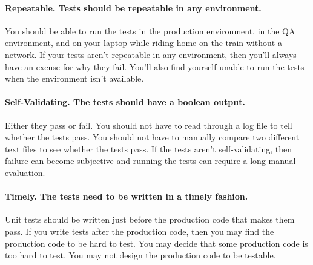 \paragraph{Repeatable. Tests should be repeatable in any environment.}
You should be able to run the tests in the production environment, in the QA environment, and on your laptop while riding home on the train without a network. 
If your tests aren’t repeatable in any environment, then you’ll always have an excuse for why they fail. 
You’ll also find yourself unable to run the tests when the environment isn’t available.\cite{MartinClean}

\paragraph{Self-Validating. The tests should have a boolean output.}
Either they pass or fail. 
You should not have to read through a log file to tell whether the tests pass. 
You should not have to manually compare two different text files to see whether the tests pass. 
If the tests aren’t self-validating, then failure can become subjective and running the tests can require a long manual evaluation.\cite{MartinClean}

\paragraph{Timely. The tests need to be written in a timely fashion.}
Unit tests should be written just before the production code that makes them pass. 
If you write tests after the production code, then you may find the production code to be hard to test. 
You may decide that some production code is too hard to test. 
You may not design the production code to be testable.\cite{MartinClean}

